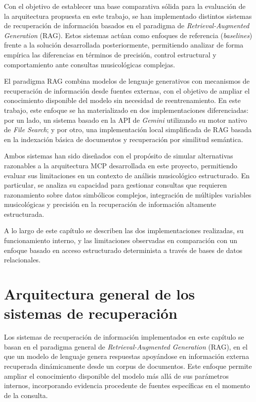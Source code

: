 
Con el objetivo de establecer una base comparativa sólida para la evaluación de la arquitectura propuesta en este trabajo, se han implementado distintos sistemas de recuperación de información basados en el paradigma de \textit{Retrieval-Augmented Generation} (RAG). Estos sistemas actúan como enfoques de referencia (\textit{baselines}) frente a la solución desarrollada posteriormente, permitiendo analizar de forma empírica las diferencias en términos de precisión, control estructural y comportamiento ante consultas musicológicas complejas.

El paradigma RAG combina modelos de lenguaje generativos con mecanismos de recuperación de información desde fuentes externas, con el objetivo de ampliar el conocimiento disponible del modelo sin necesidad de reentrenamiento. En este trabajo, este enfoque se ha materializado en dos implementaciones diferenciadas: por un lado, un sistema basado en la API de \textit{Gemini} utilizando su motor nativo de \textit{File Search}; y por otro, una implementación local simplificada de RAG basada en la indexación básica de documentos y recuperación por similitud semántica.

Ambos sistemas han sido diseñados con el propósito de simular alternativas razonables a la arquitectura MCP desarrollada en este proyecto, permitiendo evaluar sus limitaciones en un contexto de análisis musicológico estructurado. En particular, se analiza su capacidad para gestionar consultas que requieren razonamiento sobre datos simbólicos complejos, integración de múltiples variables musicológicas y precisión en la recuperación de información altamente estructurada.

A lo largo de este capítulo se describen las dos implementaciones realizadas, su funcionamiento interno, y las limitaciones observadas en comparación con un enfoque basado en acceso estructurado determinista a través de bases de datos relacionales.

\section{Arquitectura general de los sistemas de recuperación}
Los sistemas de recuperación de información implementados en este capítulo se basan en el paradigma general de \textit{Retrieval-Augmented Generation} (RAG), en el que un modelo de lenguaje genera respuestas apoyándose en información externa recuperada dinámicamente desde un corpus de documentos. Este enfoque permite ampliar el conocimiento disponible del modelo más allá de sus parámetros internos, incorporando evidencia procedente de fuentes específicas en el momento de la consulta.

